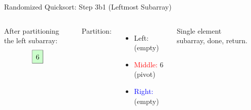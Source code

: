 \begin{frame}{Randomized Quicksort: Step 3b1 (Leftmost Subarray)}
  \begin{columns}[t]
    After partitioning the left subarray:
    \[
      \renewcommand{\arraystretch}{1.5}
      \begin{array}{|c|c|c|}
        \hline
        \cellcolor{green!20}{6} \\
        \hline
      \end{array}
    \]

    Partition:
    \begin{itemize}
      \item \textcolor{green!60!black}{Left:} (empty)
      \item \textcolor{red}{Middle:} 6 (pivot)
      \item \textcolor{blue}{Right:} (empty)
    \end{itemize}
    Single element subarray, done, return.
    \begin{minipage}[t]{\linewidth}
      \vspace{0pt} %
      \begin{center}


\end{center}
\end{minipage}
\end{columns}
\end{frame}
